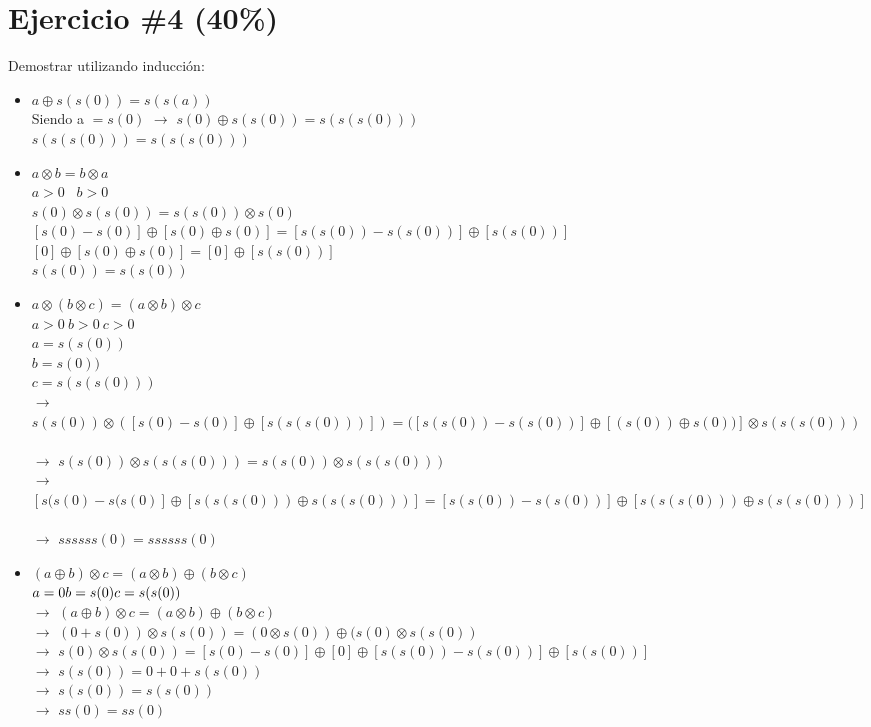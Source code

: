 \documentclass{article}
\begin{document}
\section*{Ejercicio \#4 (40\%)}
Demostrar utilizando inducci\'on:
\begin{itemize}
	\item{$a\oplus s(s(0))=s(s(a))$}
	\ \\ 
		Siendo a $=s(0)$ $\rightarrow$ $s(0) \oplus s(s(0)) = s(s(s(0)))$
		\ \\ $s(s(s(0)))=s(s(s(0)))$

	\item{$a \otimes b = b \otimes a$}
	\ \\
	 $ a > 0$ \ $b > 0 $
	 \ \\ $s(0) \otimes s(s(0)) = s(s(0)) \otimes s(0)$
	 \ \\ $[s(0)-s(0)] \oplus [s(0)\oplus s(0)] = [s(s(0)) - s(s(0))] \oplus [s(s(0))]$
	 \ \\ $[0] \oplus [s(0) \oplus s(0)] = [0] \oplus [s(s(0))] $  
	 \ \\ $s(s(0)) = s(s(0)) $

	\item{$a \otimes (b \otimes c)=(a\otimes b)\otimes c$}
	\ \\ 

		$a>0 \ b>0 \ c>0 $
		\ \\ $a=s(s(0))$
		\ \\ $b=s(0)) $
		\ \\ $c=s(s(s(0)))$
		\ \\ $\rightarrow$ $s(s(0)) \otimes ([s(0)-s(0)] \oplus [s(s(s(0)))]) = ([s(s(0))-s(s(0))] \oplus [(s(0)) \oplus s(0))] \otimes s(s(s(0)))$
		\ \\ $\rightarrow$ $s(s(0)) \otimes s(s(s(0)))=s(s(0)) \otimes s(s(s(0)))$
		\ \\ $\rightarrow$ $[s(s(0)-s(s(0)] \oplus [s(s(s(0))) \oplus s(s(s(0)))] = [s(s(0)) -s(s(0))] \oplus [s(s(s(0))) \oplus s(s(s(0)))]$
		\ \\ $\rightarrow$ $ssssss(0) = ssssss(0)$

	\item{$(a\oplus b)\otimes c = (a\otimes b) \oplus (b \otimes c)$}
	\ \\ $a=0 \\ b=s(0) \\ c=s(s(0))$
		\ \\ $\rightarrow$ $ (a\oplus b)\otimes c = (a\otimes b) \oplus (b \otimes c)$
		\ \\ $\rightarrow$ $(0+s(0))\otimes s(s(0))=(0\otimes s(0)) \oplus (s(0) \otimes s(s(0))$
		\ \\ $\rightarrow$ $s(0) \otimes s(s(0)) = [s(0)-s(0)] \oplus[0] \oplus [s(s(0))-s(s(0))] \oplus [s(s(0))]$
		\ \\ $\rightarrow$ $s(s(0)) = 0 + 0 + s(s(0))$
		\ \\ $\rightarrow$ $s(s(0)) = s(s(0))$
		\ \\ $\rightarrow$ $ss(0)=ss(0)$
\end{itemize}
\end{document}
